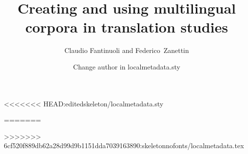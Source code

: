 

\title{Creating and using multilingual corpora in translation studies}  %
\subtitle{}
\dedication{Change dedication in localmetadata.sty}
<<<<<<< HEAD:editedskeleton/localmetadata.sty
\author{Claudio Fantinuoli and Federico~Zanettin}
=======
\author{Change author in localmetadata.sty}
\renewcommand{\lsISBN}{978-3-000000-00-0}                     
\renewcommand{\lsSeries}{dummyseries} %
\renewcommand{\lsSeriesNumber}{99} %
\renewcommand{\lsURL}{http://langsci-press.org/catalog/book/0} %
>>>>>>> 6cf520f889db62a28d99d9b1151dda7039163890:skeletonnofonts/localmetadata.tex
